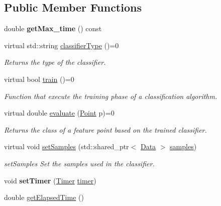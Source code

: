 \subsection*{Public Member Functions}
\begin{DoxyCompactItemize}
\item 
\mbox{\label{class_classifier_aafc336f2b6c72ef7ad46f93f40063452}} 
double {\bfseries get\+Max\+\_\+time} () const
\item 
virtual std\+::string \hyperlink{class_classifier_a7bfe7cc88b851b4a7e7ec55b30dd844e}{classifier\+Type} ()=0
\begin{DoxyCompactList}\small\item\em Returns the type of the classifier. \end{DoxyCompactList}\item 
virtual bool \hyperlink{class_classifier_a2306a5de27555ab093593ac9642bc7d9}{train} ()=0
\begin{DoxyCompactList}\small\item\em Function that execute the training phase of a classification algorithm. \end{DoxyCompactList}\item 
virtual double \hyperlink{class_classifier_ae8e9554823b85ddc2dcad2955da811d9}{evaluate} (\hyperlink{class_point}{Point} p)=0
\begin{DoxyCompactList}\small\item\em Returns the class of a feature point based on the trained classifier. \end{DoxyCompactList}\item 
virtual void \hyperlink{class_classifier_a6cbc0189f7fcd1afe68096af8f24c58a}{set\+Samples} (std\+::shared\+\_\+ptr$<$ \hyperlink{class_data}{Data} $>$ \hyperlink{class_classifier_aad6a4fcea8f44339d7a6302f530852ca}{samples})
\begin{DoxyCompactList}\small\item\em set\+Samples Set the samples used in the classifier. \end{DoxyCompactList}\item 
\mbox{\label{class_classifier_aeadfa75f26ea79e525db5767a965da6e}} 
void {\bfseries set\+Timer} (\hyperlink{class_timer}{Timer} \hyperlink{class_classifier_ae9d28253495ae8807d586faff951d46f}{timer})
\item 
double \hyperlink{class_classifier_ab47b67b061041193aa3ae2a7856f4980}{get\+Elapsed\+Time} ()

\end{DoxyCompactItemize}
